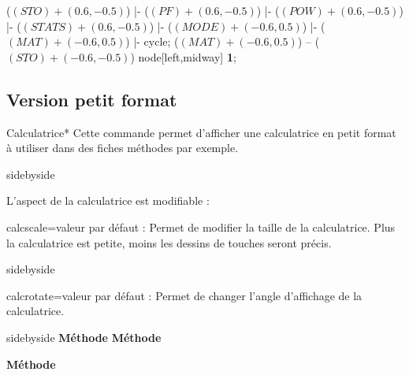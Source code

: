\documentclass[10pt,french,a4paper]{article}
\begin{document}
\begin{dispListing}
\draw[red, line width=1pt,rounded corners = 5pt]%
    ($(STO) + (0.6,-0.5)$) |- ($(PF) + (0.6,-0.5)$) |-
    ($(POW) + (0.6,-0.5)$) |- ($(STATS) + (0.6,-0.5)$) |-
    ($(MODE) + (-0.6,0.5)$) |- ($(MAT) + (-0.6,0.5)$) |- cycle;
\path[red]  ($(MAT) + (-0.6,0.5)$) -- ($(STO) + (-0.6,-0.5)$) node[left,midway] {\textbf 1};
\end{dispListing}

\subsection{Version petit format}

\begin{docCommand}{Calculatrice*}{}
    Cette commande permet d'afficher une calculatrice en petit format à utiliser dans des fiches méthodes par exemple.
\end{docCommand}

\begin{dispExample*}{sidebyside}
\Calculatrice*
\end{dispExample*}

L'aspect de la calculatrice est modifiable :

\begin{docKey}{calcscale}{=}{valeur par défaut : }
Permet de modifier la taille de la calculatrice. Plus la calculatrice est petite, moins les dessins de touches seront précis.
\end{docKey}

\begin{dispExample*}{sidebyside}
\Calculatrice*[calcscale=1]
\Calculatrice*[calcscale=0.25]
\end{dispExample*}

\begin{docKey}{calcrotate}{=}{valeur par défaut : }
Permet de changer l'angle d'affichage de la calculatrice.
\end{docKey}

\begin{dispExample*}{sidebyside}
\Calculatrice*[calcrotate=0] \textbf{Méthode}
\qquad
\Calculatrice*[calcrotate=90] \textbf{Méthode}
\par\bigskip
\Calculatrice*[calcrotate=-30]
\hspace{-1em}\textbf{Méthode}
\qquad
{}
\Calculatrice*[calcrotate=0]
\end{dispExample*}
\end{document}
